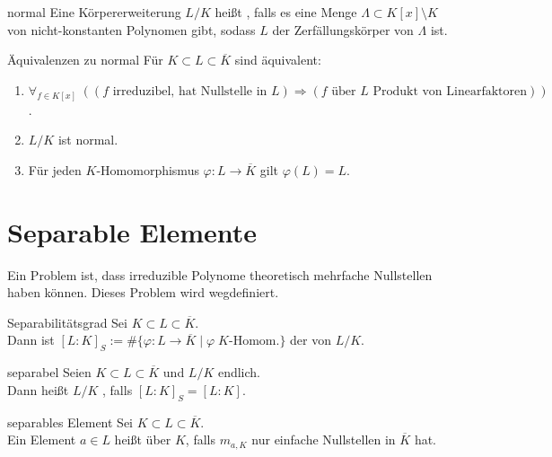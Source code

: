 \begin{Def}{normal}
    Eine Körpererweiterung $L/K$ heißt , falls
    es eine Menge $\Lambda \subset K[x] \setminus K$ von nicht-konstanten
    Polynomen gibt, sodass $L$ der Zerfällungskörper von $\Lambda$ ist.
\end{Def}

\begin{Prop}{Äquivalenzen zu normal}
    Für $K \subset L \subset \overline{K}$ sind äquivalent:
    \begin{enumerate}[label=(\alph*)]
        \item
        $\forall_{f \in K[x]}\;
        ((f \text{ irreduzibel, hat Nullstelle in } L) \Rightarrow
        (f \text{ über } L \text{ Produkt von Linearfaktoren}))$.

        \item
        $L/K$ ist normal.

        \item
        Für jeden $K$-Homomorphismus $\varphi\colon L \rightarrow \overline{K}$
        gilt $\varphi(L) = L$.
    \end{enumerate}
\end{Prop}

\section{%
    Separable Elemente%
}

\begin{Bem}
    Ein Problem ist, dass irreduzible Polynome theoretisch mehrfache
    Nullstellen haben können.
    Dieses Problem wird wegdefiniert.
\end{Bem}

\begin{Def}{Separabilitätsgrad}
    Sei $K \subset L \subset \overline{K}$.\\
    Dann ist
    $[L:K]_S := \#\{\varphi\colon L \rightarrow \overline{K} \;|\;
    \varphi\; K\text{-Homom.}\}$
    der  von $L/K$.
\end{Def}

\begin{Def}{separabel}
    Seien $K \subset L \subset \overline{K}$ und $L/K$ endlich.\\
    Dann heißt $L/K$ , falls $[L:K]_S = [L:K]$.
\end{Def}

\begin{Def}{separables Element}
    Sei $K \subset L \subset \overline{K}$.\\
    Ein Element $a \in L$ heißt  über $K$, falls
    $m_{a,K}$ nur einfache Nullstellen in $\overline{K}$ hat.
\end{Def}

